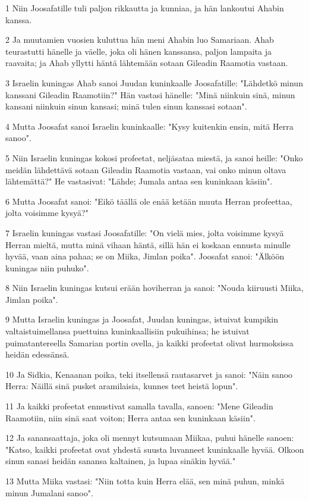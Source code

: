\par 1 Niin Joosafatille tuli paljon rikkautta ja kunniaa, ja hän lankoutui Ahabin kanssa.
\par 2 Ja muutamien vuosien kuluttua hän meni Ahabin luo Samariaan. Ahab teurastutti hänelle ja väelle, joka oli hänen kanssansa, paljon lampaita ja raavaita; ja Ahab yllytti häntä lähtemään sotaan Gileadin Raamotia vastaan.
\par 3 Israelin kuningas Ahab sanoi Juudan kuninkaalle Joosafatille: "Lähdetkö minun kanssani Gileadin Raamotiin?" Hän vastasi hänelle: "Minä niinkuin sinä, minun kansani niinkuin sinun kansasi; minä tulen sinun kanssasi sotaan".
\par 4 Mutta Joosafat sanoi Israelin kuninkaalle: "Kysy kuitenkin ensin, mitä Herra sanoo".
\par 5 Niin Israelin kuningas kokosi profeetat, neljäsataa miestä, ja sanoi heille: "Onko meidän lähdettävä sotaan Gileadin Raamotia vastaan, vai onko minun oltava lähtemättä?" He vastasivat: "Lähde; Jumala antaa sen kuninkaan käsiin".
\par 6 Mutta Joosafat sanoi: "Eikö täällä ole enää ketään muuta Herran profeettaa, jolta voisimme kysyä?"
\par 7 Israelin kuningas vastasi Joosafatille: "On vielä mies, jolta voisimme kysyä Herran mieltä, mutta minä vihaan häntä, sillä hän ei koskaan ennusta minulle hyvää, vaan aina pahaa; se on Miika, Jimlan poika". Joosafat sanoi: "Älköön kuningas niin puhuko".
\par 8 Niin Israelin kuningas kutsui erään hoviherran ja sanoi: "Nouda kiiruusti Miika, Jimlan poika".
\par 9 Mutta Israelin kuningas ja Joosafat, Juudan kuningas, istuivat kumpikin valtaistuimellansa puettuina kuninkaallisiin pukuihinsa; he istuivat puimatantereella Samarian portin ovella, ja kaikki profeetat olivat hurmoksissa heidän edessänsä.
\par 10 Ja Sidkia, Kenaanan poika, teki itsellensä rautasarvet ja sanoi: "Näin sanoo Herra: Näillä sinä pusket aramilaisia, kunnes teet heistä lopun".
\par 11 Ja kaikki profeetat ennustivat samalla tavalla, sanoen: "Mene Gileadin Raamotiin, niin sinä saat voiton; Herra antaa sen kuninkaan käsiin".
\par 12 Ja sanansaattaja, joka oli mennyt kutsumaan Miikaa, puhui hänelle sanoen: "Katso, kaikki profeetat ovat yhdestä suusta luvanneet kuninkaalle hyvää. Olkoon sinun sanasi heidän sanansa kaltainen, ja lupaa sinäkin hyvää."
\par 13 Mutta Miika vastasi: "Niin totta kuin Herra elää, sen minä puhun, minkä minun Jumalani sanoo".
